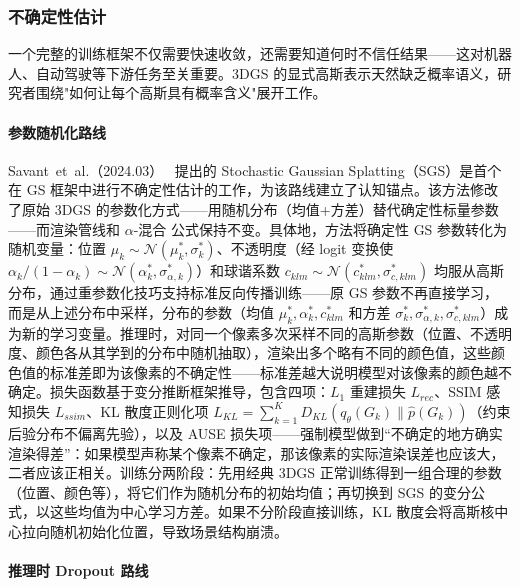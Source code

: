 \subsubsection{不确定性估计}

一个完整的训练框架不仅需要快速收敛，还需要知道何时不信任结果——这对机器人、自动驾驶等下游任务至关重要。3DGS 的显式高斯表示天然缺乏概率语义，研究者围绕"如何让每个高斯具有概率含义"展开工作。

\paragraph{参数随机化路线}

Savant~et~al.（2024.03）~\cite{2403_18476} 提出的 Stochastic Gaussian Splatting（SGS）是首个在 GS 框架中进行不确定性估计的工作，为该路线建立了认知锚点。该方法修改了原始 3DGS 的参数化方式——用随机分布（均值+方差）替代确定性标量参数——而渲染管线和 $\alpha$-混合 公式保持不变。具体地，方法将确定性 GS 参数转化为随机变量：位置 $\mu_k \sim \mathcal{N}(\mu_k^*, \sigma_k^*)$、不透明度（经 logit 变换使 $\alpha_k/(1-\alpha_k) \sim \mathcal{N}(\alpha_k^*, \sigma_{\alpha,k}^*)$）和球谐系数 $c_{klm} \sim \mathcal{N}(c_{klm}^*, \sigma_{c,klm}^*)$ 均服从高斯分布，通过重参数化技巧支持标准反向传播训练——原 GS 参数不再直接学习，而是从上述分布中采样，分布的参数（均值 $\mu_k^*, \alpha_k^*, c_{klm}^*$ 和方差 $\sigma_k^*, \sigma_{\alpha,k}^*, \sigma_{c,klm}^*$）成为新的学习变量。推理时，对同一个像素多次采样不同的高斯参数（位置、不透明度、颜色各从其学到的分布中随机抽取），渲染出多个略有不同的颜色值，这些颜色值的标准差即为该像素的不确定性——标准差越大说明模型对该像素的颜色越不确定。损失函数基于变分推断框架推导，包含四项：$L_1$ 重建损失 $L_{rec}$、SSIM 感知损失 $L_{ssim}$、KL 散度正则化项 $L_{KL} = \sum_{k=1}^{K} D_{KL}(q_\theta(G_k) \| \hat{p}(G_k))$（约束后验分布不偏离先验），以及 AUSE 损失项——强制模型做到``不确定的地方确实渲染得差''：如果模型声称某个像素不确定，那该像素的实际渲染误差也应该大，二者应该正相关。训练分两阶段：先用经典 3DGS 正常训练得到一组合理的参数（位置、颜色等），将它们作为随机分布的初始均值；再切换到 SGS 的变分公式，以这些均值为中心学习方差。如果不分阶段直接训练，KL 散度会将高斯核中心拉向随机初始化位置，导致场景结构崩溃。

\paragraph{推理时 Dropout 路线}

